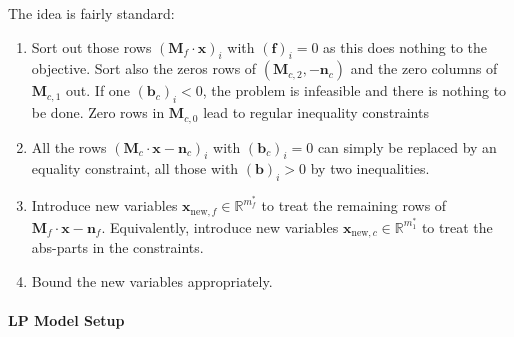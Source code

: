 \documentclass{article}
\newcommand{\setR}{\mathbb{R}}%
\newcommand{\vectorfont}[1]{\boldsymbol{#1}}%
\newcommand{\matrixfont}[1]{\mathbf{#1}}%
\newcommand{\bvec}{\vectorfont{b}}
\newcommand{\fvec}{\vectorfont{f}}
\newcommand{\nvec}{\vectorfont{n}}
\newcommand{\xvec}{\vectorfont{x}}
\newcommand{\Mmat}{\matrixfont{M}}
\begin{document}
The idea is fairly standard:
\begin{enumerate}
  \item{\color{gray}Sort out those rows $(\Mmat_f \cdot \xvec)_i$ with $(\fvec)_i = 0$ as this does nothing to the objective.
  Sort also the zeros rows of $(\Mmat_{c,2},-\nvec_c)$ and the zero columns of $\Mmat_{c,1}$ out.
  If one $(\bvec_c)_i < 0$, the problem is infeasible and there is nothing to be done.
  Zero rows in $\Mmat_{c,0}$ lead to regular inequality constraints
  }
  \item{All the rows $(\Mmat_c \cdot \xvec - \nvec_c)_i$ with $(\bvec_c)_i = 0$ can simply be replaced by an equality constraint, all those with $(\bvec)_i > 0$ by two inequalities.
  }
  \item{Introduce new variables $\xvec_{\mathrm{new},f} \in \setR^{m_f^\ast}$ to treat the remaining rows of $\Mmat_{f} \cdot \xvec - \nvec_{f}$.
  Equivalently, introduce new variables $\xvec_{\mathrm{new},c} \in \setR^{m_1^\ast}$ to treat the abs-parts in the constraints.
  }
  \item{Bound the new variables appropriately.
  }
\end{enumerate}


\paragraph{LP Model Setup}
\end{document}

